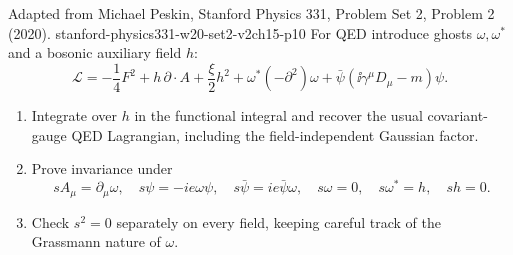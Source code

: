 \begin{enumerate}
  {Adapted from Michael Peskin, Stanford Physics 331, Problem Set 2, Problem 2 (2020).}
  {stanford-physics331-w20-set2-v2ch15-p10}
  For QED introduce ghosts \(\omega,\omega^*\) and a bosonic auxiliary
  field \(h\):
  \[
    \mathcal L=-\frac14F^2+h\,\partial\cdot A+\frac{\xi}{2}h^2
      +\omega^*(-\partial^2)\omega
      +\bar\psi(\ii\gamma^\mu D_\mu-m)\psi .
  \]
  \begin{enumerate}
    \item[(a)] Integrate over \(h\) in the functional integral and recover
      the usual covariant-gauge QED Lagrangian, including the
      field-independent Gaussian factor.
    \item[(b)] Prove invariance under
      \[
        sA_\mu=\partial_\mu\omega,\quad
        s\psi=-ie\omega\psi,\quad s\bar\psi=ie\bar\psi\omega,\quad
        s\omega=0,\quad s\omega^*=h,\quad sh=0 .
      \]
    \item[(c)] Check \(s^2=0\) separately on every field, keeping careful
      track of the Grassmann nature of \(\omega\).
  \end{enumerate}


\end{enumerate}
